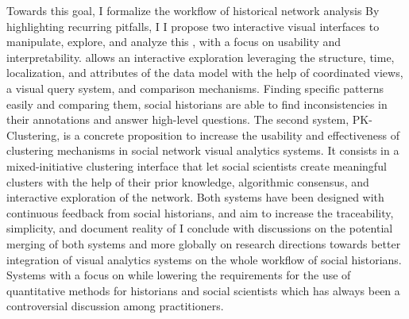 {    Towards this goal, I formalize the workflow of historical network analysis 
    By highlighting recurring pitfalls, I 
    I propose two interactive visual interfaces to manipulate, explore, and analyze this , with a focus on usability and interpretability.
     allows an interactive exploration leveraging the structure, time, localization, and attributes of the data model with the help of coordinated views, a visual query system, and comparison mechanisms.
    Finding specific patterns easily and comparing them, social historians are able to find inconsistencies in their annotations and answer high-level questions.
    The second system, PK-Clustering, is a concrete proposition to increase the usability and effectiveness of clustering mechanisms in social network visual analytics systems. It consists in a mixed-initiative clustering interface that let social scientists create meaningful clusters with the help of their prior knowledge, algorithmic consensus, and interactive exploration of the network.
    Both systems have been designed with continuous feedback from social historians, and aim to increase the traceability, simplicity, and document reality of
    I conclude with discussions on the potential merging of both systems and more globally on research directions towards better integration of visual analytics systems on the whole workflow of social historians.
    Systems with a focus on  while lowering the requirements for the use of quantitative methods for historians and social scientists which has always been a controversial discussion among practitioners.
}

